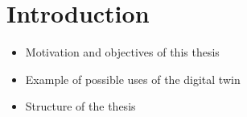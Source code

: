\chapter{Introduction}\label{ch:introduction}

\begin{itemize}
    \item Motivation and objectives of this thesis
    \item Example of possible uses of the digital twin 
    \item Structure of the thesis 
\end{itemize}
